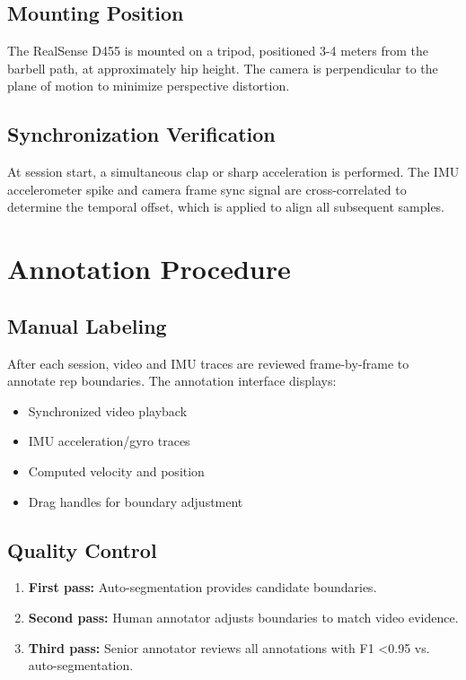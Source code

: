 \subsection{Mounting Position}

The RealSense D455 is mounted on a tripod, positioned 3-4 meters from the barbell path, at approximately hip height. The camera is perpendicular to the plane of motion to minimize perspective distortion.

\subsection{Synchronization Verification}

At session start, a simultaneous clap or sharp acceleration is performed. The IMU accelerometer spike and camera frame sync signal are cross-correlated to determine the temporal offset, which is applied to align all subsequent samples.

\section{Annotation Procedure}

\subsection{Manual Labeling}

After each session, video and IMU traces are reviewed frame-by-frame to annotate rep boundaries. The annotation interface displays:
\begin{itemize}
    \item Synchronized video playback
    \item IMU acceleration/gyro traces
    \item Computed velocity and position
    \item Drag handles for boundary adjustment
\end{itemize}

\subsection{Quality Control}

\begin{enumerate}
    \item \textbf{First pass:} Auto-segmentation provides candidate boundaries.
    \item \textbf{Second pass:} Human annotator adjusts boundaries to match video evidence.
    \item \textbf{Third pass:} Senior annotator reviews all annotations with F1 <0.95 vs. auto-segmentation.
\end{enumerate}

